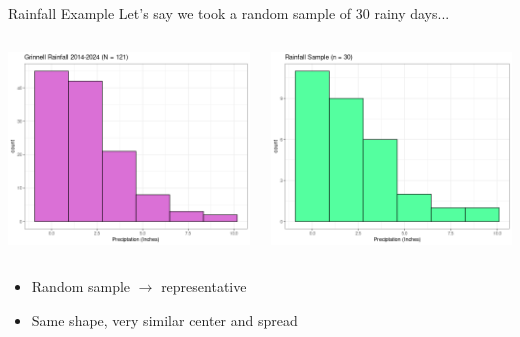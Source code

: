 \documentclass{beamer}
\begin{document}
\begin{frame}{Rainfall Example}
Let's say we took a random sample of 30 rainy days...
\begin{columns}

  \begin{column}{0.45\textwidth}
\begin{center}
\includegraphics[scale=0.32]{grin_rain.png}
\end{center}
  \end{column}
  \begin{column}{0.45\textwidth}
\begin{center}
\includegraphics[scale=0.32]{grin_rain_samp.png}
\end{center}
  \end{column}

\end{columns}
\begin{itemize}
    \item Random sample $\rightarrow$ representative
    \item Same shape, very similar center and spread
\end{itemize}
\end{frame}
\end{document}
